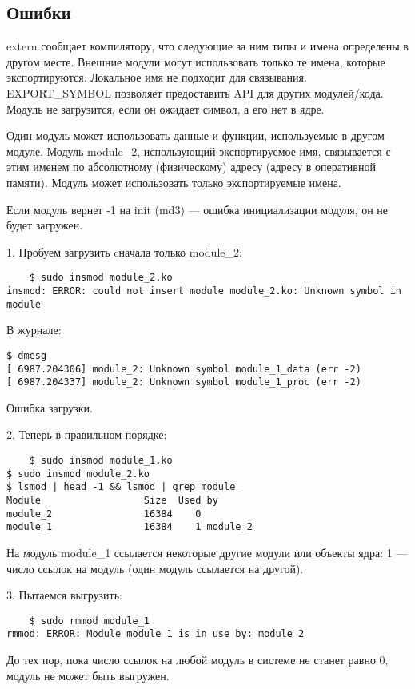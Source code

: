 \subsection{Ошибки}
extern сообщает компилятору, что следующие за ним типы и имена определены в другом месте. Внешние модули могут использовать только те имена, которые экспортируются. Локальное имя не подходит для связывания. EXPORT\_SYMBOL позволяет предоставить API для других модулей/кода. Модуль не загрузится, если он ожидает символ, а его нет в ядре.

Один модуль может использовать данные и функции, используемые в другом модуле. Модуль module\_2, использующий экспортируемое имя, связывается с этим именем по абсолютному (физическому) адресу (адресу в оперативной памяти). Модуль может использовать только экспортируемые имена. 

Если модуль вернет -1 на init (md3) --- ошибка инициализации модуля, он не будет загружен.

1. Пробуем загрузить cначала только module\_2:
\begin{lstlisting}
    $ sudo insmod module_2.ko
insmod: ERROR: could not insert module module_2.ko: Unknown symbol in module
\end{lstlisting}

В журнале:
\begin{lstlisting}
$ dmesg
[ 6987.204306] module_2: Unknown symbol module_1_data (err -2)
[ 6987.204337] module_2: Unknown symbol module_1_proc (err -2)
\end{lstlisting}

Ошибка загрузки.

2. Теперь в правильном порядке:

\begin{lstlisting}
    $ sudo insmod module_1.ko
$ sudo insmod module_2.ko
$ lsmod | head -1 && lsmod | grep module_
Module                  Size  Used by
module_2                16384    0
module_1                16384    1 module_2
\end{lstlisting}

На модуль module\_1 ссылается некоторые другие модули или объекты ядра: 1 — число ссылок на модуль (один модуль ссылается на другой).

3. Пытаемся выгрузить:
\begin{lstlisting}
    $ sudo rmmod module_1
rmmod: ERROR: Module module_1 is in use by: module_2
\end{lstlisting}
До тех пор, пока число ссылок на любой модуль в системе не станет равно 0, модуль не может быть выгружен.

